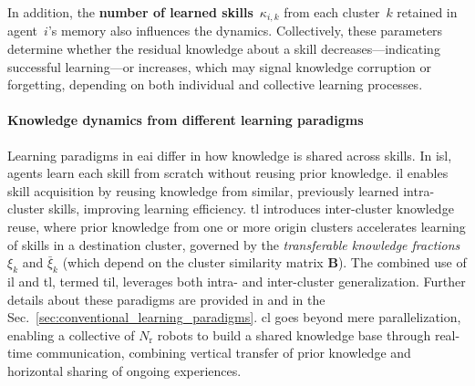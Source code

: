 \documentclass[12pt]{article}
\renewcommand{\emph}[1]{\textit{#1}}
\begin{document}
In addition, the \textbf{number of learned skills}~$\kappa_{i,k}$ from each cluster~$k$ retained in agent~$i$’s memory also influences the dynamics. Collectively, these parameters determine whether the residual knowledge about a skill decreases---indicating successful learning---or increases, which may signal knowledge corruption or forgetting, depending on both individual and collective learning processes.

\paragraph*{Knowledge dynamics from different learning paradigms}
Learning paradigms in \ac{eai} differ in how knowledge is shared across skills. In \ac{isl}, agents learn each skill from scratch without reusing prior knowledge. \Ac{il} enables skill acquisition by reusing knowledge from similar, previously learned intra-cluster skills, improving learning efficiency. \Ac{tl} introduces inter-cluster knowledge reuse, where prior knowledge from one or more origin clusters accelerates learning of skills in a destination cluster, governed by the \emph{transferable knowledge fractions} $\xi_k$ and $\bar{\xi}_k$ (which depend on the cluster similarity matrix $\bm{B}$). The combined use of \ac{il} and \ac{tl}, termed \ac{til}, leverages both intra- and inter-cluster generalization. Further details about these paradigms are provided in  and in the  Sec.~\ref{sec:conventional_learning_paradigms}. \Ac{cl} goes beyond mere parallelization, enabling a collective of $N_\mathrm{r}$ robots to build a shared knowledge base through real-time communication, combining vertical transfer of prior knowledge and horizontal sharing of ongoing experiences.

\end{document}

